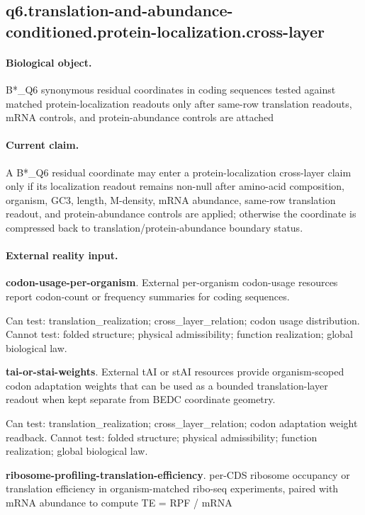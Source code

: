\subsection{q6.translation-and-abundance-conditioned.protein-localization.cross-layer}

\paragraph{Biological object.} B*\_Q6 synonymous residual coordinates in coding sequences tested against matched protein-localization readouts only after same-row translation readouts, mRNA controls, and protein-abundance controls are attached

\paragraph{Current claim.} A B*\_Q6 residual coordinate may enter a protein-localization cross-layer claim only if its localization readout remains non-null after amino-acid composition, organism, GC3, length, M-density, mRNA abundance, same-row translation readout, and protein-abundance controls are applied; otherwise the coordinate is compressed back to translation/protein-abundance boundary status.

\paragraph{External reality input.}
\textbf{codon-usage-per-organism}. External per-organism codon-usage resources report codon-count or frequency summaries for coding sequences.

Can test: translation\_realization; cross\_layer\_relation; codon usage distribution. Cannot test: folded structure; physical admissibility; function realization; global biological law.

\textbf{tai-or-stai-weights}. External tAI or stAI resources provide organism-scoped codon adaptation weights that can be used as a bounded translation-layer readout when kept separate from BEDC coordinate geometry.

Can test: translation\_realization; cross\_layer\_relation; codon adaptation weight readback. Cannot test: folded structure; physical admissibility; function realization; global biological law.

\textbf{ribosome-profiling-translation-efficiency}. per-CDS ribosome occupancy or translation efficiency in organism-matched ribo-seq experiments, paired with mRNA abundance to compute TE = RPF / mRNA

